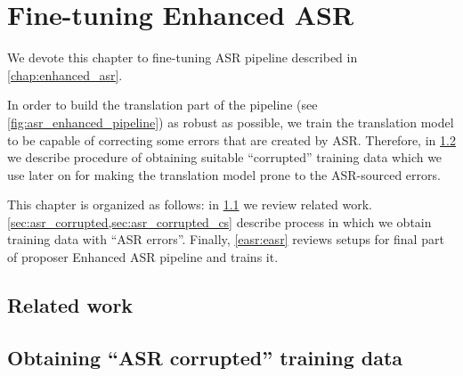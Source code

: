 \chapter{Fine-tuning Enhanced ASR}
\label{chap:fine_tune_enhanced}

We devote this chapter to fine-tuning ASR pipeline described in \cref{chap:enhanced_asr}.

In order to build the translation part of the pipeline (see \cref{fig:asr_enhanced_pipeline}) as robust as possible, we train the translation model to be capable of correcting some errors that are created by ASR. Therefore, in \cref{sec:asr_corrupted} we describe procedure of obtaining suitable ``corrupted'' training data which we use later on for making the translation model prone to the ASR-sourced errors.

This chapter is organized as follows: in \cref{feasr:related} we review related work. \cref{sec:asr_corrupted,sec:asr_corrupted_cs} describe process in which we obtain training data with ``ASR errors''. Finally, \cref{easr:easr} reviews setups for final part of proposer Enhanced ASR pipeline and trains it.

\section{Related work}
\label{feasr:related}

\section{Obtaining ``ASR corrupted'' training data}
\label{sec:asr_corrupted}

